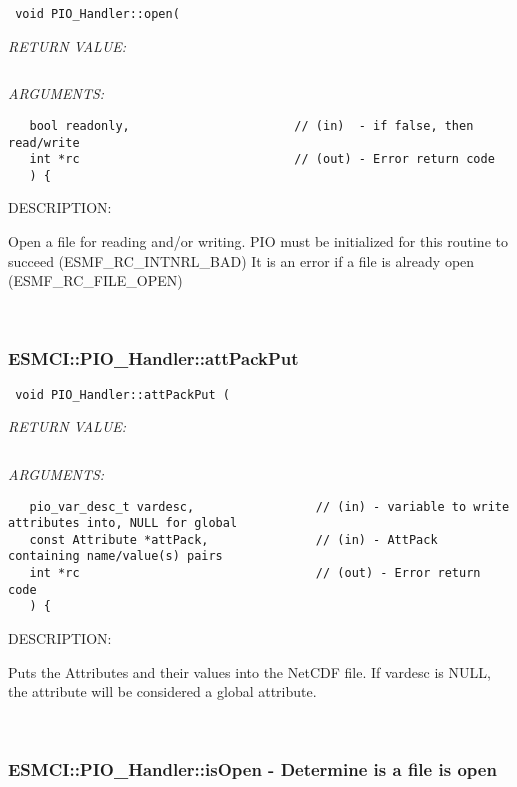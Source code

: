   
\begin{verbatim} void PIO_Handler::open(\end{verbatim}{\em RETURN VALUE:}
\begin{verbatim}      \end{verbatim}{\em ARGUMENTS:}
\begin{verbatim}   bool readonly,                       // (in)  - if false, then read/write
   int *rc                              // (out) - Error return code
   ) {\end{verbatim}
{\sf DESCRIPTION:\\ }


      Open a file for reading and/or writing.
      PIO must be initialized for this routine to succeed (ESMF_RC_INTNRL_BAD)
      It is an error if a file is already open (ESMF_RC_FILE_OPEN)
   
 
\mbox{}\hrulefill\
 
\subsubsection [ESMCI::PIO\_Handler::attPackPut] {ESMCI::PIO\_Handler::attPackPut}


  
\begin{verbatim} void PIO_Handler::attPackPut (\end{verbatim}{\em RETURN VALUE:}
\begin{verbatim} \end{verbatim}{\em ARGUMENTS:}
\begin{verbatim}   pio_var_desc_t vardesc,                 // (in) - variable to write attributes into, NULL for global
   const Attribute *attPack,               // (in) - AttPack containing name/value(s) pairs
   int *rc                                 // (out) - Error return code
   ) {\end{verbatim}
{\sf DESCRIPTION:\\ }


      Puts the Attributes and their values into the NetCDF file.  If vardesc is NULL, the
      attribute will be considered a global attribute.
   
 
\mbox{}\hrulefill\
 
\subsubsection [ESMCI::PIO\_Handler::isOpen] {ESMCI::PIO\_Handler::isOpen - Determine is a file is open}


